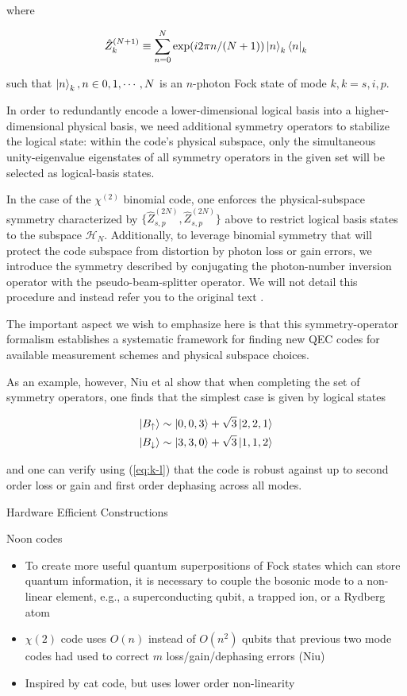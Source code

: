 \documentclass[12]{amsart}
\newcommand\0{\mathbf{0}}
\newcommand\<{\langle}
\renewcommand\>{\rangle}
\begin{document}
where

\begin{align*}
\hat{Z}_{k}^{(N + 1)} \equiv \sum_{n=0}^{N}\exp(i 2 \pi n / (N+1))	\ket{n}_k \bra{n}_k
\end{align*}

such that $\ket{n}_k, n \in 0, 1, \cdots, N$ is an $n$-photon Fock state of mode $k, k = s, i, p$.


In order to redundantly encode a lower-dimensional logical basis into a higher-dimensional physical basis, we need additional symmetry operators to stabilize the logical state: within the code’s physical subspace, only the simultaneous unity-eigenvalue eigenstates of all symmetry operators in the given set will be selected as logical-basis states.

In the case of the $\chi^{(2)}$ binomial code, one enforces the physical-subspace symmetry characterized by $\{ \hat{Z}_{s, p}^{(2N)}, \hat{Z}_{s, p}^{(2N)}\}$ above to restrict logical basis states to the subspace $\mathcal{H}_N$. Additionally, to leverage binomial symmetry that will protect the code subspace from distortion by photon loss or gain errors, we introduce the symmetry described by conjugating the photon-number inversion operator with the pseudo-beam-splitter operator. We will not detail this procedure and instead refer you to the original text \cite{niu2018hardware}.

The important aspect we wish to emphasize here is that this symmetry-operator formalism establishes a systematic framework for finding new QEC codes for available measurement schemes and physical subspace choices.

As an example, however, Niu et al show that when completing the set of symmetry operators, one finds that the simplest case is given by logical states

\begin{align*}
	\ket{B_{\uparrow}} &\sim \ket{0, 0, 3} + \sqrt{3}\ket{2, 2, 1}\\
	\ket{B_{\downarrow}} &\sim \ket{3, 3, 0} + \sqrt{3}\ket{1, 1, 2}
\end{align*}

and one can verify using (\ref{eq:k-l}) that the code is robust against up to second order loss or gain and first order dephasing across all modes.

Hardware Efficient Constructions

Noon codes

\begin{itemize}
	\item To create more useful quantum superpositions of Fock states which can store quantum information, it is necessary to couple the bosonic mode to a non-linear element, e.g., a superconducting qubit, a trapped ion, or a Rydberg atom
		\item $\chi(2)$ code uses $O(n)$ instead of $O(n^2)$ qubits that previous two mode codes had used to correct $m$ loss/gain/dephasing errors (Niu)
		\item Inspired by cat code, but uses lower order non-linearity
	\end{itemize}
\end{document}
